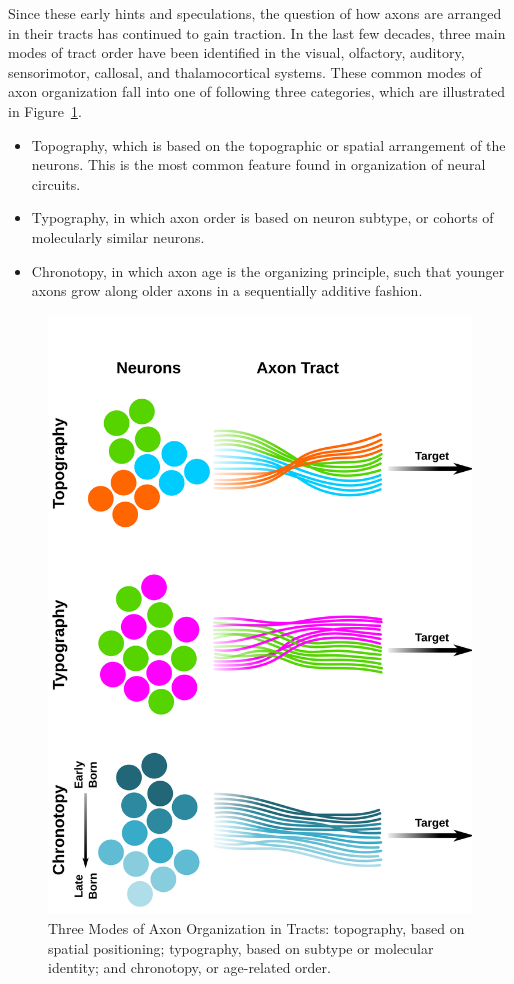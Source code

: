 Since these early hints and speculations, the question of how axons are arranged in their tracts has continued to gain traction. 
In the last few decades, three main modes of tract order have been identified in the visual, olfactory, auditory, sensorimotor, callosal, and thalamocortical systems.
These common modes of axon organization fall into one of following three categories, which are illustrated in Figure~\ref{AxonOrg_ThreeModes}.  
\begin{itemize}
\item Topography, which is based on the topographic or spatial arrangement of the neurons. This is the most common feature found in organization of neural circuits.
\item Typography, in which axon order is based on neuron subtype, or cohorts of molecularly similar neurons.
\item Chronotopy, in which axon age is the organizing principle, such that younger axons grow along older axons in a sequentially additive fashion. 
\end{itemize}
\begin{figure}[hbtp]
	\begin{center}
	\includegraphics[width=\textwidth]{figures/AxonOrg_ThreeModes.svg}
	\caption[Three Modes of Axon Organization in Tracts]{Three Modes of Axon Organization in Tracts: topography, based on spatial positioning; typography, based on subtype or molecular identity; and chronotopy, or age-related order. \label{AxonOrg_ThreeModes}}
	\end{center}
\end{figure}
